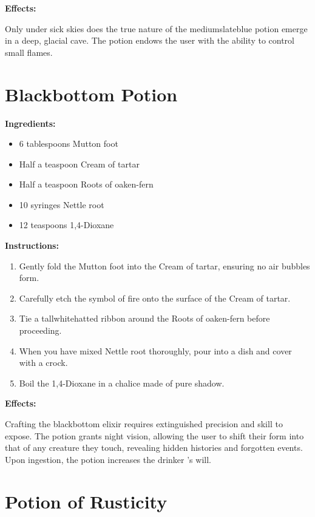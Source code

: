 \documentclass{article}
\begin{document}
\textbf{Effects:}

Only under sick skies does the true nature of the mediumslateblue potion emerge in a deep, glacial cave. The potion endows the user with the ability to control small flames.

\newpage
\section*{Blackbottom Potion}

\textbf{Ingredients:}

\begin{itemize}
  \item 6 tablespoons Mutton foot
  \item Half a teaspoon Cream of tartar
  \item Half a teaspoon Roots of oaken-fern
  \item 10 syringes Nettle root
  \item 12 teaspoons 1,4-Dioxane
\end{itemize}

\textbf{Instructions:}

\begin{enumerate}
  \item Gently fold the Mutton foot into the Cream of tartar, ensuring no air bubbles form.
  \item Carefully etch the symbol of fire onto the surface of the Cream of tartar.
  \item Tie a tallwhitehatted ribbon around the Roots of oaken-fern before proceeding.
  \item When you have mixed Nettle root thoroughly, pour into a dish and cover with a crock.
  \item Boil the 1,4-Dioxane in a chalice made of pure shadow.
\end{enumerate}

\textbf{Effects:}

Crafting the blackbottom elixir requires extinguished precision and skill to expose. The potion grants night vision, allowing the user to shift their form into that of any creature they touch, revealing hidden histories and forgotten events. Upon ingestion, the potion increases the drinker 's will.

\newpage
\section*{Potion of Rusticity}
\end{document}

